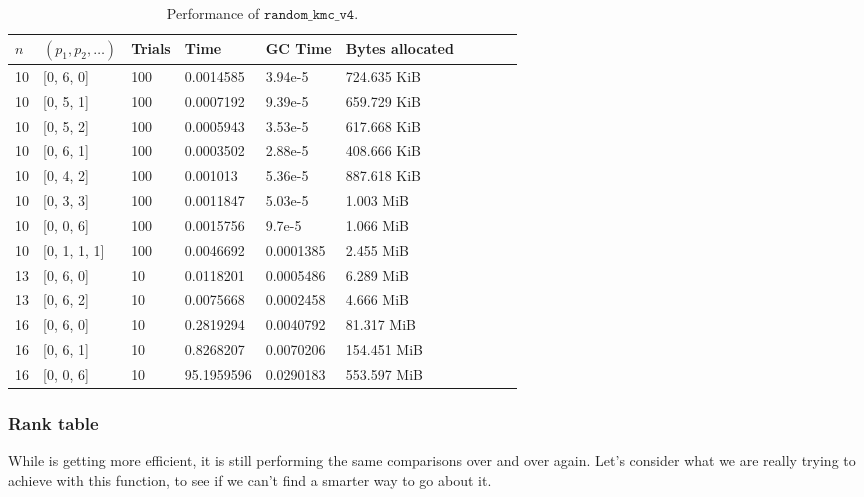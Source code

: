 \begin{table*}[ht!]
  \centering
  \caption{Performance of $\texttt{random\_kmc\_v4}$.}
  \label{tab:perf_v4}
  \begin{threeparttable}
    \begin{tabular}{llllllllll}
      \toprule
      $n$ & $(p_1, p_2, \ldots)$ & Trials & Time  & GC Time & Bytes allocated \\
      \midrule
      10 & [0, 6, 0]    & 100 & 0.0014585  & 3.94e-5   & 724.635 KiB \\ 
      10 & [0, 5, 1]    & 100 & 0.0007192  & 9.39e-5   & 659.729 KiB \\ 
      10 & [0, 5, 2]    & 100 & 0.0005943  & 3.53e-5   & 617.668 KiB \\ 
      10 & [0, 6, 1]    & 100 & 0.0003502  & 2.88e-5   & 408.666 KiB \\ 
      10 & [0, 4, 2]    & 100 & 0.001013   & 5.36e-5   & 887.618 KiB \\ 
      10 & [0, 3, 3]    & 100 & 0.0011847  & 5.03e-5   & 1.003 MiB   \\ 
      10 & [0, 0, 6]    & 100 & 0.0015756  & 9.7e-5    & 1.066 MiB   \\ 
      10 & [0, 1, 1, 1] & 100 & 0.0046692  & 0.0001385 & 2.455 MiB   \\ 
      13 & [0, 6, 0]    & 10  & 0.0118201  & 0.0005486 & 6.289 MiB   \\ 
      13 & [0, 6, 2]    & 10  & 0.0075668  & 0.0002458 & 4.666 MiB   \\ 
      16 & [0, 6, 0]    & 10  & 0.2819294  & 0.0040792 & 81.317 MiB  \\ 
      16 & [0, 6, 1]    & 10  & 0.8268207  & 0.0070206 & 154.451 MiB \\ 
      16 & [0, 0, 6]    & 10  & 95.1959596 & 0.0290183 & 553.597 MiB \\ 
      \bottomrule
    \end{tabular}
  \end{threeparttable}
\end{table*}

\subsubsection{Rank table}
While  is getting more efficient, it is still performing the same comparisons over and over again. Let's consider what we are really trying to achieve with this function, to see if we can't find a smarter way to go about it.

